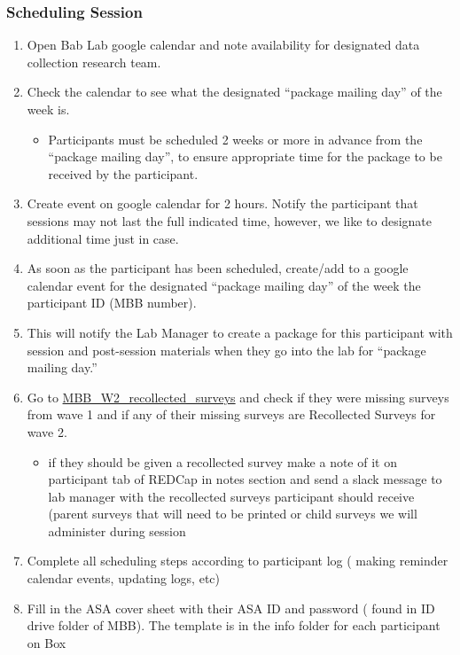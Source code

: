 \documentclass[]{book}
\providecommand{\tightlist}{%
  \setlength{\itemsep}{0pt}\setlength{\parskip}{0pt}}
\begin{document}
\hypertarget{scheduling-session}{%
\subsubsection{Scheduling Session}\label{scheduling-session}}

\begin{enumerate}
\def\labelenumi{\arabic{enumi}.}
\tightlist
\item
  Open Bab Lab google calendar and note availability for designated data collection research team.
\item
  Check the calendar to see what the designated ``package mailing day'' of the week is.

  \begin{itemize}
  \tightlist
  \item
    Participants must be scheduled 2 weeks or more in advance from the ``package mailing day'', to ensure appropriate time for the package to be received by the participant.
  \end{itemize}
\item
  Create event on google calendar for 2 hours. Notify the participant that sessions may not last the full indicated time, however, we like to designate additional time just in case.
\item
  As soon as the participant has been scheduled, create/add to a google calendar event for the designated ``package mailing day'' of the week the participant ID (MBB number).
\item
  This will notify the Lab Manager to create a package for this participant with session and post-session materials when they go into the lab for ``package mailing day.''
\item
  Go to \href{https://app.box.com/file/788366897927}{MBB\_W2\_recollected\_surveys} and check if they were missing surveys from wave 1 and if any of their missing surveys are Recollected Surveys for wave 2.

  \begin{itemize}
  \tightlist
  \item
    if they should be given a recollected survey make a note of it on participant tab of REDCap in notes section and send a slack message to lab manager with the recollected surveys participant should receive (parent surveys that will need to be printed or child surveys we will administer during session
  \end{itemize}
\item
  Complete all scheduling steps according to participant log ( making reminder calendar events, updating logs, etc)
\item
  Fill in the ASA cover sheet with their ASA ID and password ( found in ID drive folder of MBB). The template is in the info folder for each participant on Box
\end{enumerate}
\end{document}

